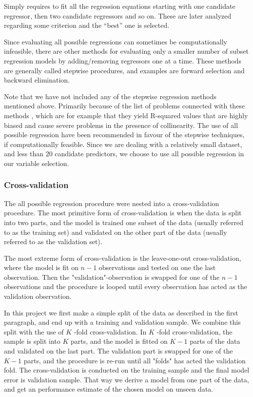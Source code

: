 \documentclass[11pt]{article}
\begin{document}
Simply requires to fit all the regression equations starting with one candidate regressor, then two
candidate regressors and so on. These are later analyzed regarding some criterion and the “best” one is selected. 

Since evaluating all possible regressions can sometimes be computationally infeasible, there are other
methods for evaluating only a smaller number of subset regression models by adding/removing regressors one
at a time. These methods are generally called stepwise procedures, and examples are forward selection and backward
elimination. 

Note that we have not included any of the stepwise regression methods mentioned above. Primarily
because of the list of problems connected with these methods \cite{20856}, which are for example that they yield
R-squared values that are highly biased and cause severe problems in the presence of collinearity. 
The use of all possible regression have been recommended in favour of the stepwise techniques, if 
computationally feasible. \cite{Montgomery2012} Since we are dealing with a relatively small dataset, 
and less than 20 candidate predictors, we choose to use all possible regression in our variable selection.

\subsubsection{Cross-validation}
\label{sec:orgb31a0ac}
The all possible regression procedure were nested into a cross-validation procedure. The most 
primitive form of cross-validation is when the data is split into two parts, and the model
is trained one subset of the data (usually referred to as the training set) and validated 
on the other part of the data (usually referred to as the validation set).

The most extreme form of cross-validation is the leave-one-out cross-validation, where the model 
is fit on \(n - 1\) observations and tested on one the last observation. Then the "validation"-observation 
is swapped for one of the \(n - 1\) observations and the procedure is looped until every observation has acted 
as the validation observation.

In this project we first make a simple split of the data as described in the first paragraph, and 
end up with a training and validation sample. We combine this split with the use of
\(K\) -fold cross-validation. In \(K\) -fold cross-validation, the sample is split into \(K\) parts, and the
model is fitted on \(K - 1\) parts of the data and validated on the last part. The validation part is swapped for one of
the \(K - 1\) parts, and the procedure is re-run until all "folds" has acted the validation fold. The cross-validation 
is conducted on the training sample and the final model error is validation sample. That way we derive a model
from one part of the data, and get an performance estimate of the chosen model on unseen data.
\end{document}
